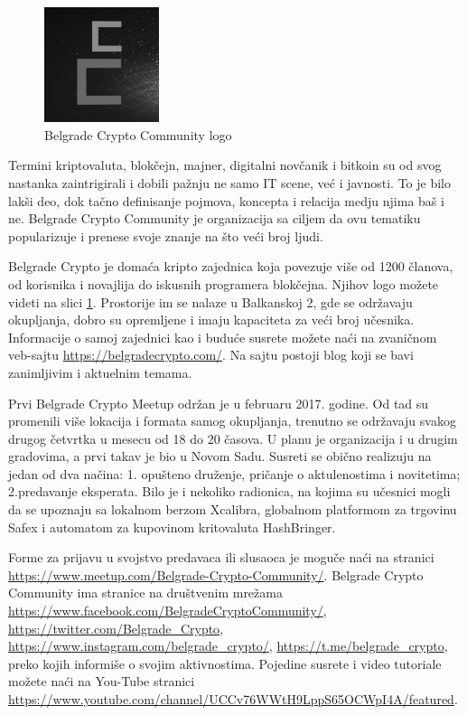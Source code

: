 \documentclass[a4paper]{article}
\begin{document}
{\begin{figure}[h]
  \centering
  \includegraphics[width=0.3\textwidth]{bcc_logo.png}
  \caption{Belgrade Crypto Community logo}
  \label{fig:bgdcclogo}
\end{figure}

Termini  kriptovaluta, blokčejn, majner, digitalni novčanik i bitkoin su od svog nastanka zaintrigirali i dobili pažnju ne samo IT scene, već i javnosti. To je bilo lakši deo, dok tačno definisanje pojmova, koncepta i relacija medju njima baš i ne. Belgrade Crypto Community je organizacija sa ciljem da ovu tematiku popularizuje i prenese svoje znanje na što veći broj ljudi.

Belgrade Crypto je domaća kripto zajednica koja povezuje više od 1200 članova, od korisnika i novajlija do iskusnih programera blokčejna. Njihov logo možete videti na slici \ref{fig:bgdcclogo}. Prostorije im se nalaze u Balkanskoj 2, gde se održavaju okupljanja, dobro su opremljene i imaju kapaciteta za veći broj učesnika. Informacije o samoj zajednici kao i buduće susrete možete naći na zvaničnom veb-sajtu \url{https://belgradecrypto.com/}. Na sajtu postoji blog koji se bavi zanimljivim i aktuelnim temama.

Prvi Belgrade Crypto Meetup održan je u februaru 2017. godine. Od tad su promenili više lokacija i formata samog okupljanja, trenutno se održavaju svakog drugog četvrtka u mesecu od 18 do 20 časova. U planu je organizacija i u drugim gradovima, a prvi takav je bio u Novom Sadu. Susreti se obično realizuju na jedan od dva načina: 1. opušteno druženje, pričanje o aktulenostima i novitetima; 2.predavanje eksperata. Bilo je i nekoliko radionica, na kojima su učesnici mogli  da se upoznaju sa lokalnom berzom Xcalibra, globalnom platformom za trgovinu Safex i automatom za kupovinom kritovaluta HashBringer. 

Forme za prijavu u svojstvo predavaca ili slusaoca je moguče naći na stranici \url{https://www.meetup.com/Belgrade-Crypto-Community/}. Belgrade Crypto Community ima stranice na društvenim mrežama \url{https://www.facebook.com/BelgradeCryptoCommunity/}, \url{https://twitter.com/Belgrade_Crypto}, \url{https://www.instagram.com/belgrade_crypto/}, \url{https://t.me/belgrade_crypto}, preko kojih informiše o svojim aktivnostima. Pojedine susrete i video tutoriale možete naći na You-Tube stranici \url{https://www.youtube.com/channel/UCCv76WWtH9LppS65OCWpI4A/featured}.


}
\end{document}
